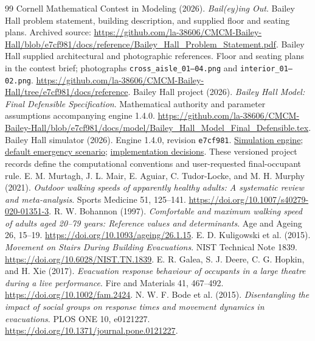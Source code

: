 \documentclass[11pt,a4paper]{article}
\begin{document}
\begin{thebibliography}{99}\small\setlength{\itemsep}{5pt}
 Cornell Mathematical Contest in Modeling (2026). \emph{Bail(ey)ing Out}. Bailey Hall problem statement, building description, and supplied floor and seating plans. Archived source: \url{https://github.com/la-38606/CMCM-Bailey-Hall/blob/e7cf981/docs/reference/Bailey_Hall_Problem_Statement.pdf}.
 Bailey Hall supplied architectural and photographic references. Floor and seating plans in the contest brief; photographs \texttt{cross\_aisle\_01--04.png} and \texttt{interior\_01--02.png}. \url{https://github.com/la-38606/CMCM-Bailey-Hall/tree/e7cf981/docs/reference}.
 Bailey Hall project (2026). \emph{Bailey Hall Model: Final Defensible Specification}. Mathematical authority and parameter assumptions accompanying engine 1.4.0. \url{https://github.com/la-38606/CMCM-Bailey-Hall/blob/e7cf981/docs/model/Bailey_Hall_Model_Final_Defensible.tex}.
 Bailey Hall simulator (2026). Engine 1.4.0, revision \texttt{e7cf981}. \href{https://github.com/la-38606/CMCM-Bailey-Hall/tree/e7cf981/src/engine}{Simulation engine}; \href{https://github.com/la-38606/CMCM-Bailey-Hall/blob/e7cf981/scenarios/emergency.json}{default emergency scenario}; \href{https://github.com/la-38606/CMCM-Bailey-Hall/blob/e7cf981/docs/implementation-decisions.md}{implementation decisions}. These versioned project records define the computational conventions and user-requested final-occupant rule.
 E. M. Murtagh, J. L. Mair, E. Aguiar, C. Tudor-Locke, and M. H. Murphy (2021). \emph{Outdoor walking speeds of apparently healthy adults: A systematic review and meta-analysis}. Sports Medicine 51, 125--141. \url{https://doi.org/10.1007/s40279-020-01351-3}.
 R. W. Bohannon (1997). \emph{Comfortable and maximum walking speed of adults aged 20--79 years: Reference values and determinants}. Age and Ageing 26, 15--19. \url{https://doi.org/10.1093/ageing/26.1.15}.
 E. D. Kuligowski et al. (2015). \emph{Movement on Stairs During Building Evacuations}. NIST Technical Note 1839. \url{https://doi.org/10.6028/NIST.TN.1839}.
 E. R. Galea, S. J. Deere, C. G. Hopkin, and H. Xie (2017). \emph{Evacuation response behaviour of occupants in a large theatre during a live performance}. Fire and Materials 41, 467--492. \url{https://doi.org/10.1002/fam.2424}.
 N. W. F. Bode et al. (2015). \emph{Disentangling the impact of social groups on response times and movement dynamics in evacuations}. PLOS ONE 10, e0121227. \url{https://doi.org/10.1371/journal.pone.0121227}.

\end{thebibliography}
\end{document}
